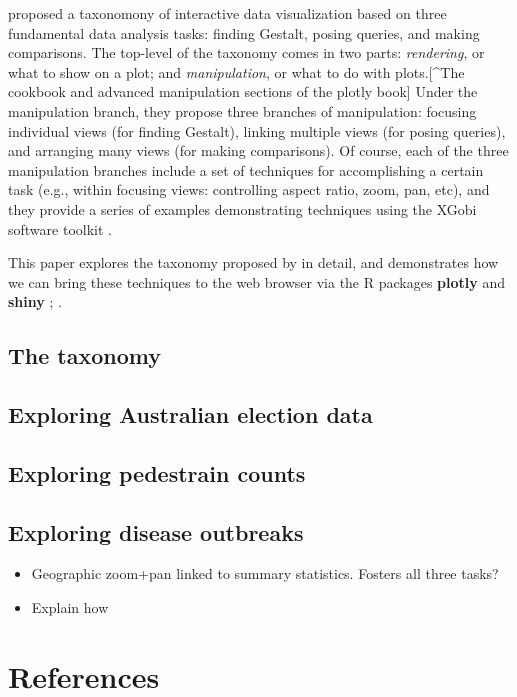 \documentclass[11pt]{isuthesis}
\providecommand{\tightlist}{%
  \setlength{\itemsep}{0pt}\setlength{\parskip}{0pt}}
\begin{document}
\citet{Cook:2007uk} proposed a taxonomony of interactive data
visualization based on three fundamental data analysis tasks: finding
Gestalt, posing queries, and making comparisons. The top-level of the
taxonomy comes in two parts: \emph{rendering}, or what to show on a
plot; and \emph{manipulation}, or what to do with plots.{[}\^{}The
cookbook and advanced manipulation sections of the plotly book{]} Under
the manipulation branch, they propose three branches of manipulation:
focusing individual views (for finding Gestalt), linking multiple views
(for posing queries), and arranging many views (for making comparisons).
Of course, each of the three manipulation branches include a set of
techniques for accomplishing a certain task (e.g., within focusing
views: controlling aspect ratio, zoom, pan, etc), and they provide a
series of examples demonstrating techniques using the XGobi software
toolkit \citep{xgobi}.

This paper explores the taxonomy proposed by \citet{Cook:2007uk} in
detail, and demonstrates how we can bring these techniques to the web
browser via the R packages \textbf{plotly} and \textbf{shiny}
\citep{plotly}; \citep{shiny}.

\section{The taxonomy}\label{the-taxonomy}

\section{Exploring Australian election
data}\label{exploring-australian-election-data}

\section{Exploring pedestrain counts}\label{exploring-pedestrain-counts}

\section{Exploring disease outbreaks}\label{exploring-disease-outbreaks}

\begin{itemize}
\tightlist
\item
  Geographic zoom+pan linked to summary statistics. Fosters all three
  tasks?
\item
  Explain how
\end{itemize}

\chapter{References}\label{references}

\hypertarget{refs}{}

\end{document}
